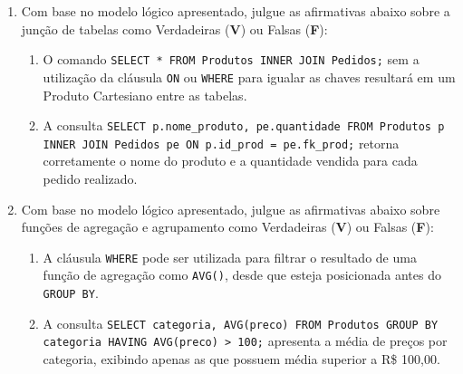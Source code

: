 \documentclass[12pt,a4paper]{article}
\begin{document}
\begin{enumerate}
    \item Com base no modelo lógico apresentado, julgue as afirmativas abaixo sobre a junção de tabelas como Verdadeiras (\textbf{V}) ou Falsas (\textbf{F}):
    \begin{enumerate}[label=( \quad )]
        \item O comando \texttt{SELECT * FROM Produtos INNER JOIN Pedidos;} sem a utilização da cláusula \texttt{ON} ou \texttt{WHERE} para igualar as chaves resultará em um Produto Cartesiano entre as tabelas.
        \item A consulta \texttt{SELECT p.nome\_produto, pe.quantidade FROM Produtos p INNER JOIN Pedidos pe ON p.id\_prod = pe.fk\_prod;} retorna corretamente o nome do produto e a quantidade vendida para cada pedido realizado.
    \end{enumerate}

    \item Com base no modelo lógico apresentado, julgue as afirmativas abaixo sobre funções de agregação e agrupamento como Verdadeiras (\textbf{V}) ou Falsas (\textbf{F}):
    \begin{enumerate}[label=( \quad )]
        \item A cláusula \texttt{WHERE} pode ser utilizada para filtrar o resultado de uma função de agregação como \texttt{AVG()}, desde que esteja posicionada antes do \texttt{GROUP BY}.
        \item A consulta \texttt{SELECT categoria, AVG(preco) FROM Produtos GROUP BY categoria HAVING AVG(preco) > 100;} apresenta a média de preços por categoria, exibindo apenas as que possuem média superior a R\$ 100,00.
    \end{enumerate}

\end{enumerate}

\vspace{0.5cm} 
\end{document}
